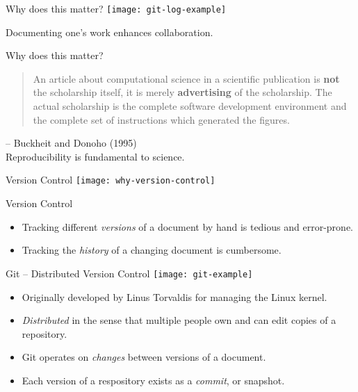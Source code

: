 \documentclass{beamer}
\begin{document}
\begin{frame}{Why does this matter?}
  \center
  \texttt{[image: git-log-example]}

  Documenting one's work enhances collaboration.
\end{frame}


\begin{frame}{Why does this matter?}

  \begin{quote}
  An article about computational science in a scientific publication is \textbf{not} the scholarship itself, it is merely \textbf{advertising} of the scholarship.
  The actual scholarship is the complete software development environment and the complete set of instructions which generated the figures.
  \end{quote}
  \center -- Buckheit and Donoho (1995)
  \hfill \\

  \center
  Reproducibility is fundamental to science.
\end{frame}


\begin{frame}{Version Control}
  \center
  \texttt{[image: why-version-control]}
\end{frame}

\begin{frame}{Version Control}
  \begin{itemize}
    \item Tracking different \textit{versions} of a document by hand is tedious and error-prone.

    \item Tracking the \textit{history} of a changing document is cumbersome.
  \end{itemize}
\end{frame}

\begin{frame}{Git -- Distributed Version Control}
  \center \texttt{[image: git-example]}
  \begin{itemize}
    \item Originally developed by Linus Torvaldis for managing the Linux kernel.

    \item \textit{Distributed} in the sense that multiple people own and can edit copies of a repository.

    \item Git operates on \textit{changes} between versions of a document.

    \item Each version of a respository exists as a \textit{commit}, or snapshot.
  \end{itemize}
\end{frame}
\end{document}
